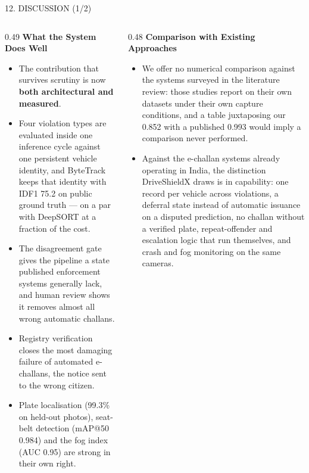 \documentclass[aspectratio=169,10pt,t]{beamer}
\newcommand{\hd}[1]{{\color{dsblue}\textbf{#1}}}          %
\begin{document}
\begin{frame}{12. DISCUSSION (1/2)}
\footnotesize
\begin{columns}[T,onlytextwidth]
\begin{column}{0.49\textwidth}
\hd{\small What the System Does Well}
\begin{itemize}\setlength{\itemsep}{0.2em}
  \item The contribution that survives scrutiny is now \textbf{both architectural and measured}.
  \item Four violation types are evaluated inside one inference cycle against one persistent vehicle identity, and
        ByteTrack keeps that identity with IDF1 75.2 on public ground truth --- on a par with DeepSORT at a fraction
        of the cost.
  \item The disagreement gate gives the pipeline a state published enforcement systems generally lack, and human
        review shows it removes almost all wrong automatic challans.
  \item Registry verification closes the most damaging failure of automated e-challans, the notice sent to the wrong
        citizen.
  \item Plate localisation (99.3\% on held-out photos), seat-belt detection (mAP@50 0.984) and the fog index
        (AUC 0.95) are strong in their own right.
\end{itemize}
\end{column}
\begin{column}{0.48\textwidth}
\hd{\small Comparison with Existing Approaches}
\begin{itemize}\setlength{\itemsep}{0.2em}
  \item We offer no numerical comparison against the systems surveyed in the literature review: those studies report
        on their own datasets under their own capture conditions, and a table juxtaposing our 0.852 with a
        published 0.993 would imply a comparison never performed.
  \item Against the e-challan systems already operating in India, the distinction DriveShieldX draws is in capability: one record per
        vehicle across violations, a deferral state instead of automatic issuance on a disputed prediction, no
        challan without a verified plate, repeat-offender and escalation logic that run themselves, and crash and fog
        monitoring on the same cameras.
\end{itemize}
\end{column}
\end{columns}
\end{frame}
\end{document}
